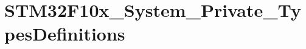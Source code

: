 \hypertarget{group___s_t_m32_f10x___system___private___types_definitions}{}\section{S\+T\+M32\+F10x\+\_\+\+System\+\_\+\+Private\+\_\+\+Types\+Definitions}
\label{group___s_t_m32_f10x___system___private___types_definitions}
